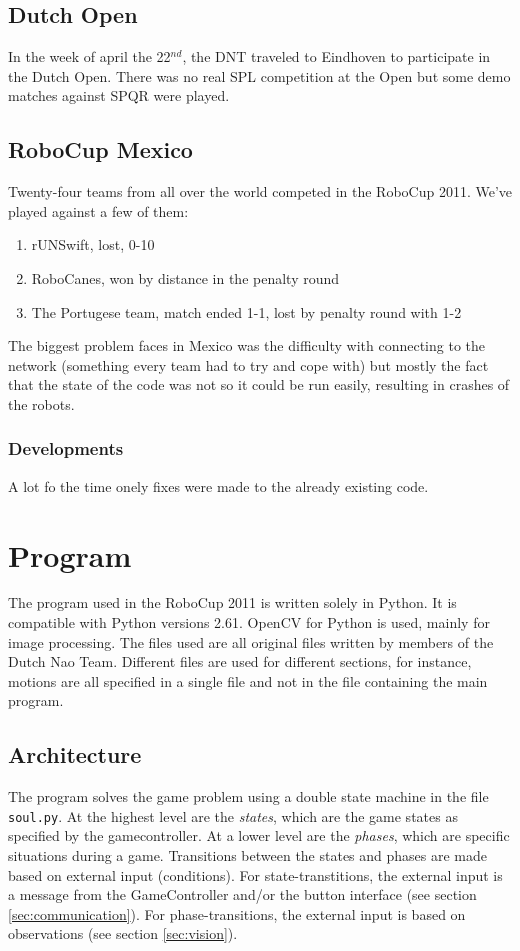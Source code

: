 \documentclass[a4paper]{article}
\begin{document}
\subsection{Dutch Open}
In the week of april the 22$^{nd}$, the DNT traveled to Eindhoven to participate in the Dutch Open. There was no real SPL competition at the Open but some demo matches against SPQR were played.

\subsection{RoboCup Mexico}
Twenty-four teams from all over the world competed in the RoboCup 2011. We've played against a few of them:
\begin{enumerate}
\item rUNSwift, lost, 0-10
\item RoboCanes, won by distance in the penalty round
\item The Portugese team, match ended 1-1, lost by penalty round with 1-2
\end{enumerate}
The biggest problem faces in Mexico was the difficulty with connecting to the network (something every team had to try and cope with) but mostly the fact that the state of the code was not so it could be run easily, resulting in crashes of the robots.
\subsubsection{Developments}
A lot fo the time onely fixes were made to the already existing code.

\section{Program}
The program used in the RoboCup 2011 is written solely in Python. It is compatible with Python versions 2.61. OpenCV for Python is used, mainly for image processing. The files used are all original files written by members of the Dutch Nao Team. Different files are used for different sections, for instance, motions are all specified in a single file and not in the file containing the main program.
\subsection{Architecture}
\label{sec:architecture}
The program solves the game problem using a double state machine in the file \texttt{soul.py}. At the highest level are the \textit{states}, which are the game states as specified by the gamecontroller. 
At a lower level are the \textit{phases}, which are specific situations during a game. Transitions between the states and phases are made based on external input (conditions). 
For state-transtitions, the external input is a message from the GameController and/or the button interface (see section \ref{sec:communication}). 
For phase-transitions, the external input is based on observations (see section \ref{sec:vision}). 
\end{document}
